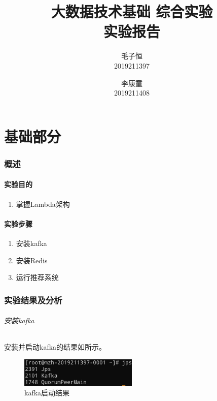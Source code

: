 \documentclass[lang=cn,11pt,a4paper,cite=authornum]{paper}
\title{大数据技术基础 综合实验 \\ 实验报告}
\author{毛子恒 \\ 2019211397 \and 李康童 \\ 2019211408}
\institute{北京邮电大学\ 计算机学院}
\date{\zhtoday}
\begin{document}
\maketitle

\part{基础部分}

\section{概述}

\subsection{实验目的}

\begin{enumerate}
    \item 掌握Lambda架构
\end{enumerate}

\subsection{实验步骤}

\begin{enumerate}
    \item 安装kafka
    \item 安装Redis
    \item 运行推荐系统
\end{enumerate}

\section{实验结果及分析}

\paragraph{安装kafka}

安装并启动kafka的结果如所示。

\begin{figure}[!htb]
    \centering
    \includegraphics[width=0.5\textwidth]{./images/1.jpg}
    \caption{kafka启动结果\label{fig:1}}
\end{figure}
\end{document}
